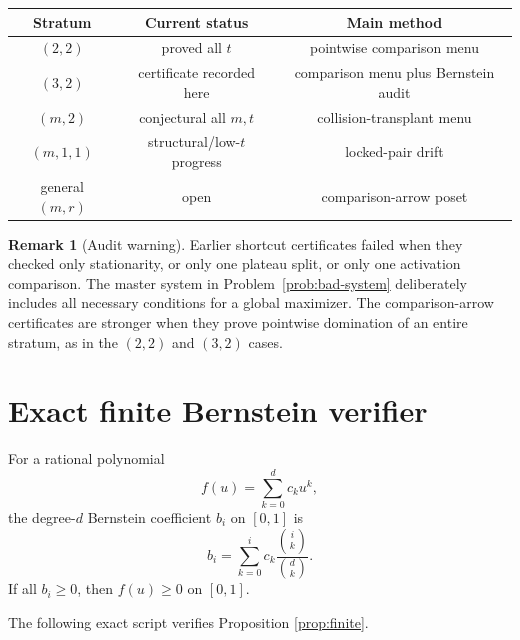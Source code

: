 \documentclass[11pt]{article}
\theoremstyle{definition}
\newtheorem{remark}[theorem]{Remark}
\begin{document}
\begin{center}
\begin{tabular}{c|c|c}
\toprule
Stratum & Current status & Main method\\
\midrule
$(2,2)$ & proved all $t$ & pointwise comparison menu\\
$(3,2)$ & certificate recorded here & comparison menu plus Bernstein audit\\
$(m,2)$ & conjectural all $m,t$ & collision-transplant menu\\
$(m,1,1)$ & structural/low-$t$ progress & locked-pair drift\\
general $(m,r)$ & open & comparison-arrow poset\\
\bottomrule
\end{tabular}
\end{center}

\begin{remark}[Audit warning]
Earlier shortcut certificates failed when they checked only stationarity, or
only one plateau split, or only one activation comparison.  The master system
in Problem~\ref{prob:bad-system} deliberately includes all necessary
conditions for a global maximizer.  The comparison-arrow certificates are
stronger when they prove pointwise domination of an entire stratum, as in the
$(2,2)$ and $(3,2)$ cases.
\end{remark}

\appendix
\section{Exact finite Bernstein verifier}\label{app:finite}

For a rational polynomial
\[
  f(u)=\sum_{k=0}^d c_k u^k,
\]
the degree-$d$ Bernstein coefficient $b_i$ on $[0,1]$ is
\[
  b_i=\sum_{k=0}^i c_k\frac{\binom{i}{k}}{\binom{d}{k}}.
\]
If all $b_i\ge0$, then $f(u)\ge0$ on $[0,1]$.

The following exact script verifies Proposition \ref{prop:finite}.
\end{document}
